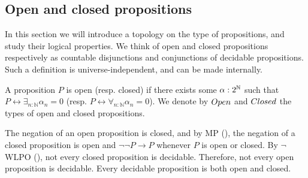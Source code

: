 %
\subsection{Open and closed propositions}
In this section we will introduce a topology on the type of propositions, and 
study their logical properties.
We think of open and closed propositions respectively as countable disjunctions and conjunctions of decidable propositions.
Such a definition is universe-independent, and can be made internally.

\begin{definition}
A proposition $P$ is open (resp. closed) if there exists some $\alpha:2^{\mathbb{N}}$ such that $P \leftrightarrow \exists_{n:\mathbb N} \alpha_n = 0$ (resp. $P \leftrightarrow \forall_{n:\mathbb N} \alpha_n = 0$). We denote by $\Open$ and $\Closed$ the types of open and closed propositions.
\end{definition}

\begin{remark}\label{rmkOpenClosedNegation}
  The negation of an open proposition is closed, 
  and by MP (), the negation of a closed proposition is open %
  and $\neg \neg P \to P$ whenever $P$ is open or closed. 
  By $\neg$WLPO (), 
  not every closed proposition is decidable. 
  Therefore, not every open proposition is decidable. 
  Every decidable proposition is both open and closed.
\end{remark}

